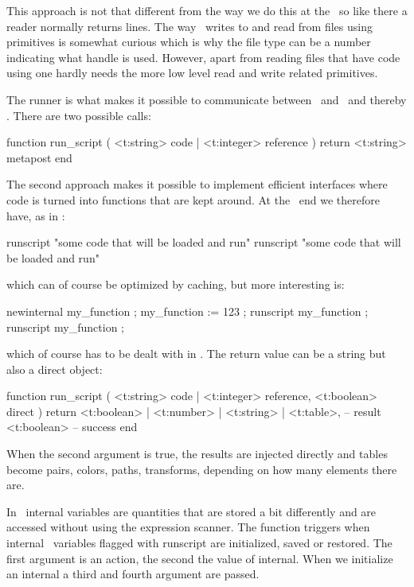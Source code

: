 This approach is not that different from the way we do this at the \TEX\ so like
there a reader normally returns lines. The way \METAPOST\ writes to and read from
files using primitives is somewhat curious which is why the file type can be a
number indicating what handle is used. However, apart from reading files that
have code using  one hardly needs the more low level
read and write related primitives.

The runner is what makes it possible to communicate between \METAPOST\ and
\LUA\ and thereby \TEX. There are two possible calls:

\starttyping[option=LUA]
function run_script ( <t:string> code | <t:integer> reference )
    return <t:string> metapost
end
\stoptyping

The second approach makes it possible to implement efficient interfaces where
code is turned into functions that are kept around. At the \METAPOST\ end we
therefore have, as in \LUATEX:

\starttyping[option=MP]
runscript "some code that will be loaded and run"
runscript "some code that will be loaded and run"
\stoptyping

which can of course be optimized by caching, but more interesting is:

\starttyping[option=MP]
newinternal my_function ; my_function := 123 ;
runscript my_function ;
runscript my_function ;
\stoptyping

which of course has to be dealt with in \LUA. The return value can be a string but also
a direct object:

\starttyping[option=LUA]
function run_script (
    <t:string> code | <t:integer> reference,
    <t:boolean> direct
)
    return
        <t:boolean> | <t:number> | <t:string> | <t:table>, -- result
        <t:boolean>                                        -- success
end
\stoptyping

When the second argument is true, the results are injected directly and tables
become pairs, colors, paths, transforms, depending on how many elements there
are.

In \METAPOST\ internal variables are quantities that are stored a bit differently
and are accessed without using the expression scanner. The 
function triggers when internal \METAPOST\ variables flagged with \type
{runscript} are initialized, saved or restored. The first argument is an action,
the second the value of internal. When we initialize an internal a third and
fourth argument are passed.


